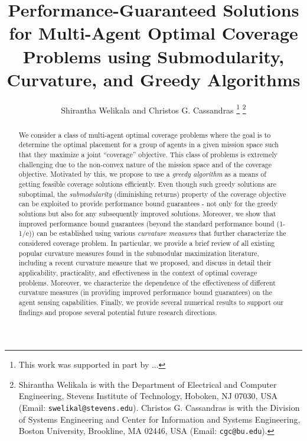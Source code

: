 \documentclass[letterpaper, 10 pt, conference]{ieeeconf}
\title{\LARGE \bf
Performance-Guaranteed Solutions for Multi-Agent Optimal Coverage Problems using Submodularity, Curvature, and Greedy Algorithms 
}
\author{Shirantha Welikala and Christos G. Cassandras %
\thanks{This work was supported in part by ... }
\thanks{Shirantha Welikala is with the Department of Electrical and Computer Engineering, Stevens Institute of Technology, Hoboken, NJ 07030, USA (Email: \texttt{{\small swelikal@stevens.edu}}). Christos G. Cassandras is with the Division of Systems Engineering and Center for Information and Systems Engineering, Boston University, Brookline, MA 02446, USA (Email: \texttt{{\small cgc@bu.edu}}).}}
\begin{document}
\maketitle

\begin{abstract}
We consider a class of multi-agent optimal coverage problems where the goal is to determine the optimal placement for a group of agents in a given mission space such that they maximize a joint ``coverage'' objective. This class of problems is extremely challenging due to the non-convex nature of the mission space and of the coverage objective. Motivated by this, we propose to use a \emph{greedy algorithm} as a means of getting feasible coverage solutions efficiently. Even though such greedy solutions are suboptimal, the \emph{submodularity} (diminishing returns) property of the coverage objective can be exploited to provide performance bound guarantees - not only for the greedy solutions but also for any subsequently improved solutions. Moreover, we show that improved performance bound guarantees (beyond the standard performance bound (1-1/e)) can be established using various \emph{curvature measures} that further characterize the considered coverage problem. In particular, we provide a brief review of all existing popular curvature measures found in the submodular maximization literature, including a recent curvature measure that we proposed, and discuss in detail their applicability, practicality, and effectiveness in the context of optimal coverage problems. Moreover, we characterize the dependence of the effectiveness of different curvature measures (in providing improved performance bound guarantees) on the agent sensing capabilities. Finally, we provide several numerical results to support our findings and propose several potential future research directions. 





\end{abstract}
\end{document}
